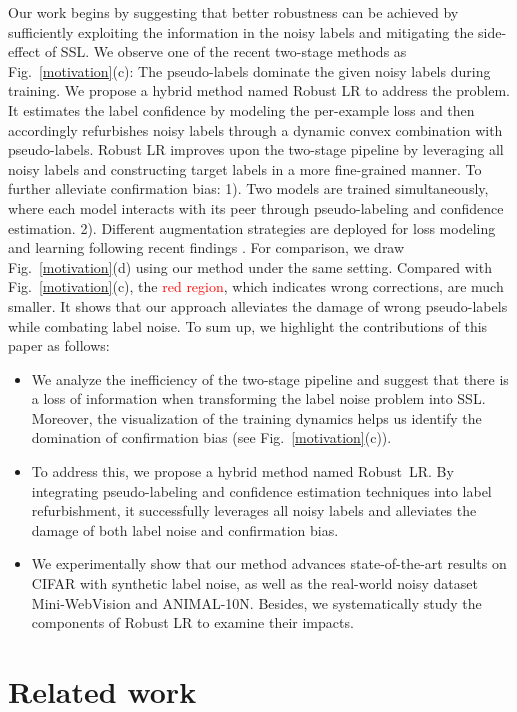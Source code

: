 \documentclass[letterpaper]{article} \usepackage{aaai23}  \usepackage{times}  \usepackage{helvet}  \usepackage{courier}  \usepackage[hyphens]{url}  \usepackage{graphicx} \urlstyle{rm} \def\UrlFont{\rm}  \usepackage{natbib}  \usepackage{caption} \frenchspacing  \setlength{\pdfpagewidth}{8.5in} \setlength{\pdfpageheight}{11in} \usepackage{algorithm}
\begin{document}
Our work begins by suggesting that better robustness can be achieved by sufficiently exploiting the information in the noisy labels and mitigating the side-effect of SSL.
We observe one of the recent two-stage methods as Fig.~\ref{motivation}(c):
The pseudo-labels dominate the given noisy labels during training.
We propose a hybrid method named Robust LR to address the problem. 
It estimates the label confidence by modeling the per-example loss and then accordingly refurbishes noisy labels through a dynamic convex combination with pseudo-labels. 
Robust LR improves upon the two-stage pipeline by leveraging all noisy labels and constructing target labels in a more fine-grained manner.
To further alleviate confirmation bias: 1). Two models are trained simultaneously, where each model interacts with its peer through pseudo-labeling and confidence estimation. 2). Different augmentation strategies are deployed for loss modeling and learning following recent findings \cite{chen2020simple,nishi2021augmentation}.
For comparison, we draw Fig.~\ref{motivation}(d) using our method under the same setting. 
Compared with Fig.~\ref{motivation}(c), the \textcolor{red}{red region}, which indicates wrong corrections, are much smaller.
It shows that our approach alleviates the damage of wrong pseudo-labels while combating label noise. 
To sum up, we highlight the contributions of this paper as follows:
\begin{itemize}
    \item We analyze the inefficiency of the two-stage pipeline and suggest that there is a loss of information when transforming the label noise problem into SSL.
    Moreover, the visualization of the training dynamics helps us identify the domination of confirmation bias (see Fig.~\ref{motivation}(c)).
    \item To address this, we propose a hybrid method named Robust~LR.
    By integrating pseudo-labeling and confidence estimation techniques into label refurbishment, it successfully leverages all noisy labels and alleviates the damage of both label noise and confirmation bias.
    \item We experimentally show that our method advances state-of-the-art results on CIFAR with synthetic label noise, as well as the real-world noisy dataset Mini-WebVision and ANIMAL-10N.
    Besides, we systematically study the components of Robust LR to examine their impacts.
\end{itemize}

\section{Related work}
\end{document}
